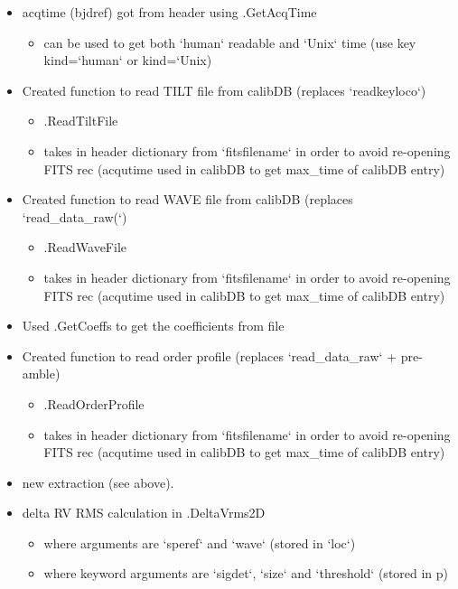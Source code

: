 \begin{itemize}
\item acqtime (bjdref) got from header using \spirouImage.GetAcqTime
	\begin{itemize}
	\item can be used to get both `human` readable and `Unix` time (use key kind=`human` or kind=`Unix)
	\end{itemize}

\item Created function to read TILT file from calibDB (replaces `readkeyloco`)
	\begin{itemize}
	\item \spirouImage.ReadTiltFile
	\item takes in header dictionary from `fitsfilename` in order to avoid re-opening FITS rec (acqutime used in calibDB to get max\_time of calibDB entry) 
	\end{itemize}

\item Created function to read WAVE file from calibDB (replaces `read\_data\_raw(`)
	\begin{itemize}
	\item \spirouImage.ReadWaveFile
	\item takes in header dictionary from `fitsfilename` in order to avoid re-opening FITS rec (acqutime used in calibDB to get max\_time of calibDB entry) 
	\end{itemize}

\item Used \spirouLOCOR.GetCoeffs to get the coefficients from file

\item Created function to read order profile (replaces `read\_data\_raw` + pre-amble)
	\begin{itemize}
	\item \spirouImage.ReadOrderProfile
	\item takes in header dictionary from `fitsfilename` in order to avoid re-opening FITS rec (acqutime used in calibDB to get max\_time of calibDB entry) 
	\end{itemize}

\item new extraction (see \calextractRAW above).

\item delta RV RMS calculation in \spirouRV.DeltaVrms2D
	\begin{itemize}
	\item where arguments are `speref` and `wave` (stored in `loc`)
	\item where keyword arguments are `sigdet`, `size` and `threshold` (stored in p)
	\end{itemize}


\end{itemize}
